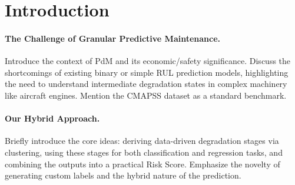 \section{Introduction}
\label{sec:intro}

\paragraph{The Challenge of Granular Predictive Maintenance.}
Introduce the context of PdM and its economic/safety significance. Discuss the shortcomings of existing binary or simple RUL prediction models, highlighting the need to understand intermediate degradation states in complex machinery like aircraft engines. Mention the CMAPSS dataset as a standard benchmark.

\paragraph{Our Hybrid Approach.}
Briefly introduce the core ideas: deriving data-driven degradation stages via clustering, using these stages for both classification and regression tasks, and combining the outputs into a practical Risk Score. Emphasize the novelty of generating custom labels and the hybrid nature of the prediction.

